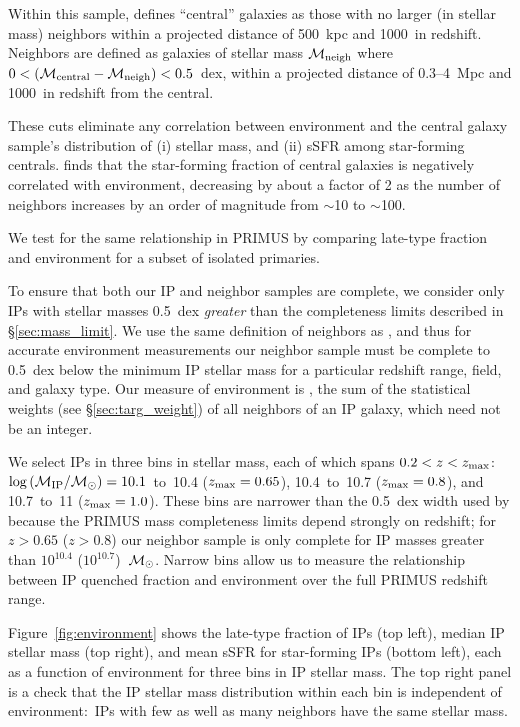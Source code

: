 Within this sample, \citePB defines ``central'' galaxies as those with no larger (in stellar mass) neighbors within a projected distance of 500~kpc and 1000~\kms in redshift.
Neighbors are defined as galaxies of stellar mass $\mneigh$ where ${0<(\mcentral-\mneigh)<0.5}$~dex, within a projected distance of 0.3--4~Mpc and 1000~\kms in redshift from the central.

These cuts eliminate any correlation between environment and the central galaxy sample's distribution of (i) stellar mass, and (ii) sSFR among star-forming centrals.
\citePB finds that the star-forming fraction of central galaxies is negatively correlated with environment, decreasing by about a factor of 2 as the number of neighbors increases by an order of magnitude from $\sim$10 to $\sim$100.

We test for the same relationship in PRIMUS by comparing late-type fraction and environment for a subset of isolated primaries.

To ensure that both our IP and neighbor samples are complete, we consider only IPs with stellar masses 0.5~dex \emph{greater} than the completeness limits described in \S\ref{sec:mass_limit}.
We use the same definition of neighbors as \citePB, and thus for accurate environment measurements our neighbor sample must be complete to 0.5~dex below the minimum IP stellar mass for a particular redshift range, field, and galaxy type.
Our measure of environment is \Nneigh, the sum of the statistical weights (see \S\ref{sec:targ_weight}) of all neighbors of an IP galaxy, which need not be an integer.

We select IPs in three bins in stellar mass, each of which spans ${0.2<z<z_{\text{max}}}$:~${\log\,(\mIP/\msun)=10.1}$~to~10.4 (${z_{\text{max}}=0.65}$),
10.4~to~10.7 (${z_{\text{max}}=0.8}$), and 
10.7~to~11 (${z_{\text{max}}=1.0}$).
These bins are narrower than the 0.5~dex width used by \citePB because the PRIMUS mass completeness limits depend strongly on redshift; for $z>0.65$ {($z>0.8$)} our neighbor sample is only complete for IP masses greater than $10^{10.4}$ ($10^{10.7}$)~$\msun$.
Narrow bins allow us to measure the relationship between IP quenched fraction and environment over the full PRIMUS redshift range.

Figure~\ref{fig:environment} shows the late-type fraction of IPs (top left), median IP stellar mass (top right), and mean sSFR for star-forming IPs (bottom left), each as a function of environment for three bins in IP stellar mass.
The top right panel is a check that the IP stellar mass distribution within each bin is independent of environment:~IPs with few as well as many neighbors have the same stellar mass.

